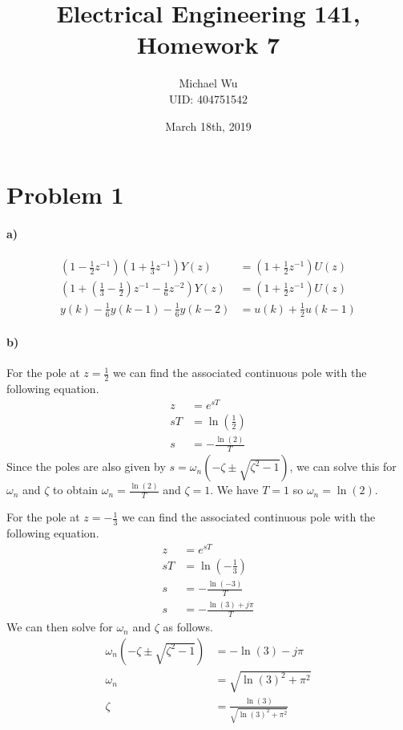 \documentclass[12pt]{article}
\begin{document}
\title{Electrical Engineering 141, Homework 7}
\date{March 18th, 2019}
\author{Michael Wu\\UID: 404751542}
\maketitle

\section*{Problem 1}

\paragraph{a)}

\begin{align*}
    \left(1-\frac{1}{2}z^{-1}\right)\left(1+\frac{1}{3}z^{-1}\right)Y(z)&=\left(1+\frac{1}{2}z^{-1}\right)U(z)\\
    \left(1+\left(\frac{1}{3}-\frac{1}{2}\right)z^{-1}-\frac{1}{6}z^{-2}\right)Y(z)&=\left(1+\frac{1}{2}z^{-1}\right)U(z)\\
    y(k)-\frac{1}{6}y(k-1)-\frac{1}{6}y(k-2)&=u(k)+\frac{1}{2}u(k-1)
\end{align*}

\paragraph{b)}

For the pole at \(z=\frac{1}{2}\) we can find the associated continuous pole with the following equation.
\begin{align*}
    z&=e^{sT}\\
    sT&=\ln\left(\frac{1}{2}\right)\\
    s&=-\frac{\ln(2)}{T}
\end{align*}
Since the poles are also given by \(s=\omega_n(-\zeta\pm\sqrt{\zeta^2-1})\), we can solve this for \(\omega_n\)
and \(\zeta\) to obtain \(\omega_n=\frac{\ln(2)}{T}\) and \(\zeta=1\). We have \(T=1\) so \(\omega_n=\ln(2)\).

For the pole at \(z=-\frac{1}{3}\) we can find the associated continuous pole with the following equation.
\begin{align*}
    z&=e^{sT}\\
    sT&=\ln\left(-\frac{1}{3}\right)\\
    s&=-\frac{\ln(-3)}{T}\\
    s&=-\frac{\ln(3)+j\pi}{T}
\end{align*}
We can then solve for \(\omega_n\) and \(\zeta\) as follows.
\begin{align*}
    \omega_n(-\zeta\pm\sqrt{\zeta^2-1})&=-\ln(3)-j\pi\\
    \omega_n&=\sqrt{\ln(3)^2+\pi^2}\\
    \zeta&=\frac{\ln(3)}{\sqrt{\ln(3)^2+\pi^2}}
\end{align*}
\end{document}
